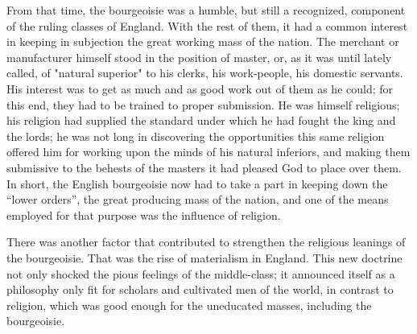 From that time, the bourgeoisie was a humble, but still a recognized, component
of the ruling classes of England. With the rest of them, it had a common
interest in keeping in subjection the great working mass of the nation. The
merchant or manufacturer himself stood in the position of master, or, as it was
until lately called, of "natural superior" to his clerks, his work-people, his
domestic servants. His interest was to get as much and as good work out of them
as he could; for this end, they had to be trained to proper submission. He was
himself religious; his religion had supplied the standard under which he had
fought the king and the lords; he was not long in discovering the opportunities
this same religion offered him for working upon the minds of his natural
inferiors, and making them submissive to the behests of the masters it had
pleased God to place over them. In short, the English bourgeoisie now had to
take a part in keeping down the ``lower orders'', the great producing mass of
the nation, and one of the means employed for that purpose was the influence of
religion. 

There was another factor that contributed to strengthen the religious leanings
of the bourgeoisie. That was the rise of materialism in England. This new
doctrine not only shocked the pious feelings of the middle-class; it announced
itself as a philosophy only fit for scholars and cultivated men of the world,
in contrast to religion, which was good enough for the uneducated masses,
including the bourgeoisie.
